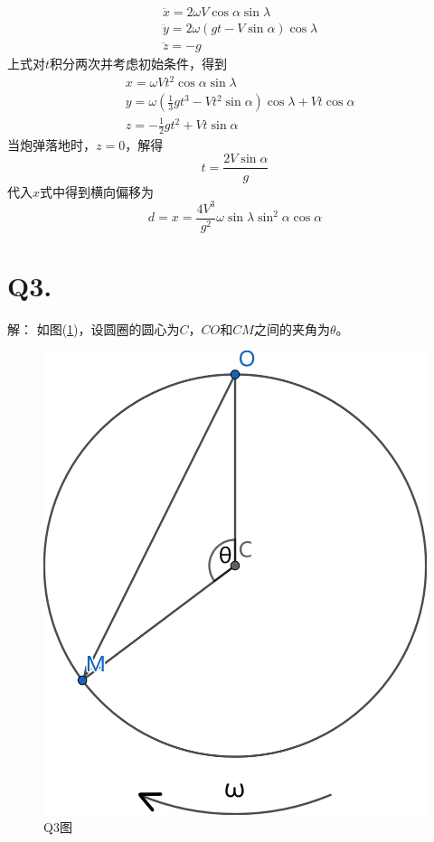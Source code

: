 \documentclass[10pt,a4paper]{article}
\begin{document}
\begin{align*}
&\ddot{x} = 2\omega V\cos\alpha\sin\lambda\\
&\ddot{y} = 2\omega(gt - V\sin\alpha)\cos\lambda\\
&\ddot{z} = -g
\end{align*}
上式对$t$积分两次并考虑初始条件，得到
\begin{align*}
&x = \omega Vt^2\cos\alpha\sin\lambda\\
&y = \omega(\frac{1}{3}gt^3 - Vt^2\sin\alpha)\cos\lambda + Vt\cos\alpha\\
&z = -\frac{1}{2}gt^2 + Vt\sin\alpha
\end{align*}
当炮弹落地时，$z = 0$，解得
\[
t = \frac{2V\sin\alpha}{g}
\]
代入$x$式中得到横向偏移为
\[
d = x = \frac{4V^3}{g^2}\omega\sin\lambda\sin^2\alpha\cos\alpha
\]
\section*{Q3.}解：
如图(\ref{Q3})，设圆圈的圆心为$C$，$CO$和$CM$之间的夹角为$\theta$。
\begin{figure}[h]
\centering
\includegraphics[scale=.15]{Homework_3Q3(marked).png}
\caption{Q3图}\label{Q3}
\end{figure}
\end{document}
